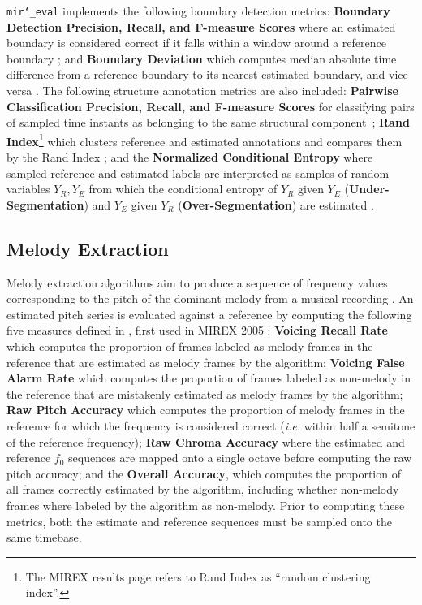 \documentclass{article}
\def\ie{\emph{i.e.}}
\def\mireval{\texttt{mir\char`_eval}}
\begin{document}
\mireval{} implements the following boundary detection metrics:
\textbf{Boundary Detection Precision, Recall, and F-measure Scores} where an estimated boundary is considered correct if it falls within a window around a reference boundary \cite{turnbull2007supervised};
and \textbf{Boundary Deviation} which computes median absolute time difference from a reference boundary to its nearest estimated boundary, and vice versa \cite{turnbull2007supervised}.
The following structure annotation metrics are also included:
\textbf{Pairwise Classification Precision, Recall, and F-measure Scores} for classifying pairs of sampled time instants as belonging to the same structural component~\cite{levy2008structural};
\textbf{Rand Index}\footnote{The MIREX results page refers to Rand Index as ``random clustering index''.} which clusters reference and estimated annotations and compares them by the Rand Index \cite{rand1971objective};
and the \textbf{Normalized Conditional Entropy} where sampled reference and estimated labels are interpreted as samples of random variables $Y_R, Y_E$ from which the conditional entropy of $Y_R$ given $Y_E$ (\textbf{Under-Segmentation}) and $Y_E$ given $Y_R$  (\textbf{Over-Segmentation}) are estimated \cite{lukashevich2008towards}.

\subsection{Melody Extraction}

Melody extraction algorithms aim to produce a sequence of frequency values corresponding to the pitch of the dominant melody from a musical recording \cite{salamon:MelodyReview:IEEESPM13}.
An estimated pitch series is evaluated against a reference by computing the following five measures defined in \cite{salamon:MelodyReview:IEEESPM13}, first used in MIREX 2005 \cite{polinerMelodyEval}:
\textbf{Voicing Recall Rate} which computes the proportion of frames labeled as melody frames in the reference that are estimated as melody frames by the algorithm;
\textbf{Voicing False Alarm Rate} which computes the proportion of frames labeled as non-melody in the reference that are mistakenly estimated as melody frames by the algorithm;
\textbf{Raw Pitch Accuracy} which computes the proportion of melody frames in the reference for which the frequency is considered correct (\ie{} within half a semitone of the reference frequency);
\textbf{Raw Chroma Accuracy} where the estimated and reference $f_0$ sequences are mapped onto a single octave before computing the raw pitch accuracy;
and the \textbf{Overall Accuracy}, which computes the proportion of all frames correctly estimated by the algorithm, including whether non-melody frames where labeled by the algorithm as non-melody.
Prior to computing these metrics, both the estimate and reference sequences must be sampled onto the same timebase.
\end{document}
